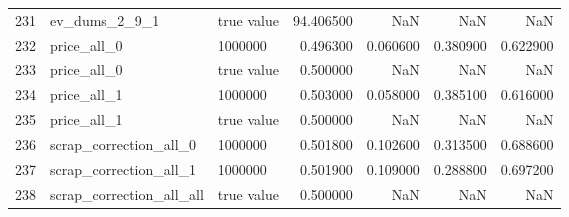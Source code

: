 \begin{tabular}{lllrrrr}
231 & ev_dums_2_9_1 & true value & 94.406500 & NaN & NaN & NaN \\
232 & price_all_0 & 1000000 & 0.496300 & 0.060600 & 0.380900 & 0.622900 \\
233 & price_all_0 & true value & 0.500000 & NaN & NaN & NaN \\
234 & price_all_1 & 1000000 & 0.503000 & 0.058000 & 0.385100 & 0.616000 \\
235 & price_all_1 & true value & 0.500000 & NaN & NaN & NaN \\
236 & scrap_correction_all_0 & 1000000 & 0.501800 & 0.102600 & 0.313500 & 0.688600 \\
237 & scrap_correction_all_1 & 1000000 & 0.501900 & 0.109000 & 0.288800 & 0.697200 \\
238 & scrap_correction_all_all & true value & 0.500000 & NaN & NaN & NaN \\
\bottomrule
\end{tabular}
